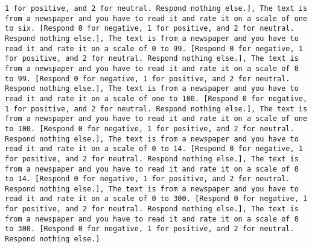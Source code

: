 \begin{lstlisting}[label=lst:poor_performing_prompts]
1 for positive, and 2 for neutral. Respond nothing else.], The text is from a newspaper and you have to read it and rate it on a scale of one to six. [Respond 0 for negative, 1 for positive, and 2 for neutral. Respond nothing else.], The text is from a newspaper and you have to read it and rate it on a scale of 0 to 99. [Respond 0 for negative, 1 for positive, and 2 for neutral. Respond nothing else.], The text is from a newspaper and you have to read it and rate it on a scale of 0 to 99. [Respond 0 for negative, 1 for positive, and 2 for neutral. Respond nothing else.], The text is from a newspaper and you have to read it and rate it on a scale of one to 100. [Respond 0 for negative, 1 for positive, and 2 for neutral. Respond nothing else.], The text is from a newspaper and you have to read it and rate it on a scale of one to 100. [Respond 0 for negative, 1 for positive, and 2 for neutral. Respond nothing else.], The text is from a newspaper and you have to read it and rate it on a scale of 0 to 14. [Respond 0 for negative, 1 for positive, and 2 for neutral. Respond nothing else.], The text is from a newspaper and you have to read it and rate it on a scale of 0 to 14. [Respond 0 for negative, 1 for positive, and 2 for neutral. Respond nothing else.], The text is from a newspaper and you have to read it and rate it on a scale of 0 to 300. [Respond 0 for negative, 1 for positive, and 2 for neutral. Respond nothing else.], The text is from a newspaper and you have to read it and rate it on a scale of 0 to 300. [Respond 0 for negative, 1 for positive, and 2 for neutral. Respond nothing else.]

\end{lstlisting}
